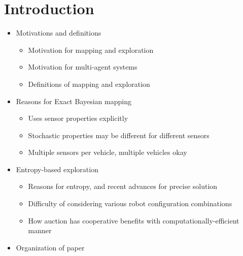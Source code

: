 \documentclass[conference]{IEEEURAI}
\begin{document}
\section{Introduction}




\begin{itemize}
	\item Motivations and definitions
	\begin{itemize}
		\item Motivation for mapping and exploration
		\item Motivation for multi-agent systems
		\item Definitions of mapping and exploration
	\end{itemize}
	\item Reasons for Exact Bayesian mapping
	\begin{itemize}
		\item Uses sensor properties explicitly
		\item Stochastic properties may be different for different sensors
		\item Multiple sensors per vehicle, multiple vehicles okay
	\end{itemize}
	\item Entropy-based exploration
	\begin{itemize}
		\item Reasons for entropy, and recent advances for precise solution
		\item Difficulty of considering various robot configuration combinations
		\item How auction has cooperative benefits with computationally-efficient manner
	\end{itemize}
	\item Organization of paper
\end{itemize}
\end{document}
